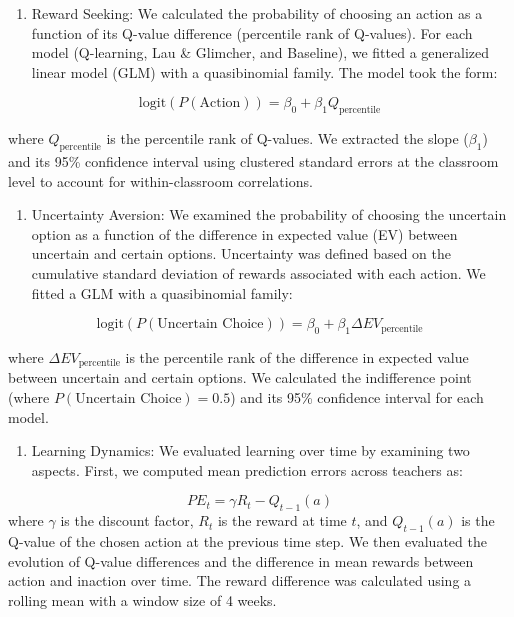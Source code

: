 \documentclass[
  number,
  preprint,
  3p,
  onecolumn]{elsarticle}
\providecommand{\tightlist}{%
  \setlength{\itemsep}{0pt}\setlength{\parskip}{0pt}}
\begin{document}
\begin{enumerate}
\def\labelenumi{\arabic{enumi}.}
\tightlist
\item
  Reward Seeking: We calculated the probability of choosing an action as
  a function of its Q-value difference (percentile rank of Q-values).
  For each model (Q-learning, Lau \& Glimcher, and Baseline), we fitted
  a generalized linear model (GLM) with a quasibinomial family. The
  model took the form:
\end{enumerate}

\[
\text{logit}(P(\text{Action})) = \beta_0 + \beta_1 Q_\text{percentile}
\]

where \(Q_\text{percentile}\) is the percentile rank of Q-values. We
extracted the slope (\(\beta_1\)) and its 95\% confidence interval using
clustered standard errors at the classroom level to account for
within-classroom correlations.

\begin{enumerate}
\def\labelenumi{\arabic{enumi}.}
\setcounter{enumi}{1}
\tightlist
\item
  Uncertainty Aversion: We examined the probability of choosing the
  uncertain option as a function of the difference in expected value
  (EV) between uncertain and certain options. Uncertainty was defined
  based on the cumulative standard deviation of rewards associated with
  each action. We fitted a GLM with a quasibinomial family:
\end{enumerate}

\[
\text{logit}(P(\text{Uncertain Choice})) = \beta_0 + \beta_1 \Delta EV_\text{percentile}
\]

where \(\Delta EV_\text{percentile}\) is the percentile rank of the
difference in expected value between uncertain and certain options. We
calculated the indifference point (where
\(P(\text{Uncertain Choice}) = 0.5\)) and its 95\% confidence interval
for each model.

\begin{enumerate}
\def\labelenumi{\arabic{enumi}.}
\setcounter{enumi}{2}
\tightlist
\item
  Learning Dynamics: We evaluated learning over time by examining two
  aspects. First, we computed mean prediction errors across teachers as:
\end{enumerate}

\[
PE_t = \gamma R_t - Q_{t-1}(a)
\] where \(\gamma\) is the discount factor, \(R_t\) is the reward at
time \(t\), and \(Q_{t-1}(a)\) is the Q-value of the chosen action at
the previous time step. We then evaluated the evolution of Q-value
differences and the difference in mean rewards between action and
inaction over time. The reward difference was calculated using a rolling
mean with a window size of 4 weeks.
\end{document}

